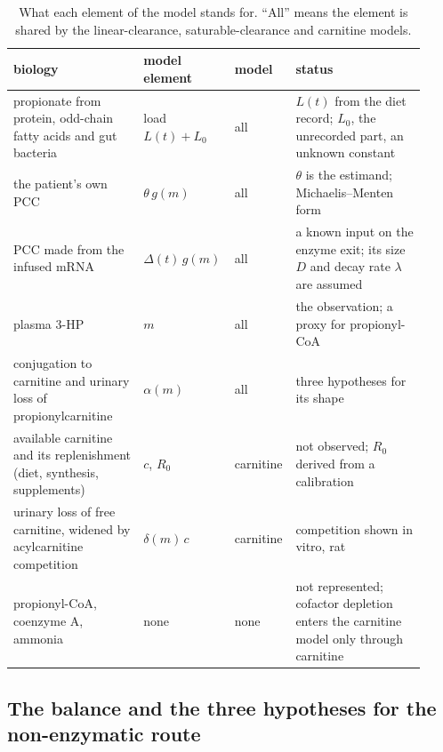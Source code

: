 \begin{table}[tbp]
\centering
\footnotesize
\renewcommand{\arraystretch}{1.15}
\caption{\label{stab:s1-biomap}What each element of the model stands for. ``All'' means the
element is shared by the linear-clearance, saturable-clearance and carnitine models.}
\begin{tabular}{@{}>{\raggedright\arraybackslash}p{0.31\linewidth}>{\raggedright\arraybackslash}p{0.19\linewidth}>{\raggedright\arraybackslash}p{0.11\linewidth}>{\raggedright\arraybackslash}p{0.31\linewidth}@{}}
\toprule
biology & model element & model & status \\
\midrule
propionate from protein, odd-chain fatty acids and gut bacteria & load $L(t)+L_0$ & all &
$L(t)$ from the diet record; $L_0$, the unrecorded part, an unknown constant \\
the patient's own PCC & $\theta\,g(m)$ & all & $\theta$ is the estimand; Michaelis--Menten
form \\
PCC made from the infused mRNA & $\Delta(t)\,g(m)$ & all & a known input on the enzyme exit;
its size $D$ and decay rate $\lambda$ are assumed \\
plasma 3-HP & $m$ & all & the observation; a proxy for propionyl-CoA \\
conjugation to carnitine and urinary loss of propionylcarnitine & $\alpha(m)$ & all &
three hypotheses for its shape \\
available carnitine and its replenishment (diet, synthesis, supplements) & $c$, $R_0$ &
carnitine & not observed; $R_0$ derived from a calibration \\
urinary loss of free carnitine, widened by acylcarnitine competition & $\delta(m)\,c$ &
carnitine & competition shown in vitro, rat~\cite{octn2_renal_transport} \\
propionyl-CoA, coenzyme A, ammonia & none & none & not represented; cofactor depletion
enters the carnitine model only through carnitine \\
\bottomrule
\end{tabular}
\end{table}

\subsection{The balance and the three hypotheses for the non-enzymatic route}
\label{si:s1-eq}


